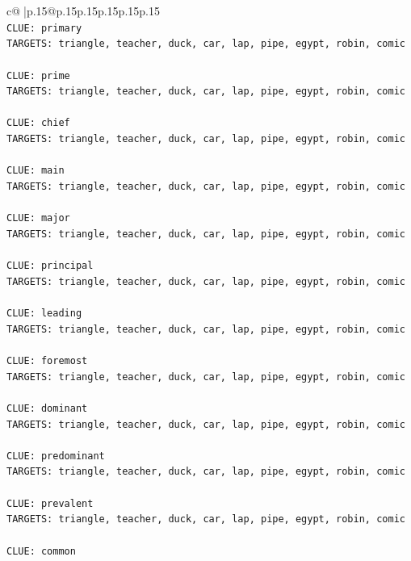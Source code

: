 \documentclass{article}
\begin{document}
{\begin{supertabular}{c@{$\;$}|p{.15\linewidth}@{}p{.15\linewidth}p{.15\linewidth}p{.15\linewidth}p{.15\linewidth}p{.15\linewidth}}
{{{\\ 
\texttt{CLUE: primary} \\
\texttt{TARGETS: triangle, teacher, duck, car, lap, pipe, egypt, robin, comic} \\
\\ 
\texttt{CLUE: prime} \\
\texttt{TARGETS: triangle, teacher, duck, car, lap, pipe, egypt, robin, comic} \\
\\ 
\texttt{CLUE: chief} \\
\texttt{TARGETS: triangle, teacher, duck, car, lap, pipe, egypt, robin, comic} \\
\\ 
\texttt{CLUE: main} \\
\texttt{TARGETS: triangle, teacher, duck, car, lap, pipe, egypt, robin, comic} \\
\\ 
\texttt{CLUE: major} \\
\texttt{TARGETS: triangle, teacher, duck, car, lap, pipe, egypt, robin, comic} \\
\\ 
\texttt{CLUE: principal} \\
\texttt{TARGETS: triangle, teacher, duck, car, lap, pipe, egypt, robin, comic} \\
\\ 
\texttt{CLUE: leading} \\
\texttt{TARGETS: triangle, teacher, duck, car, lap, pipe, egypt, robin, comic} \\
\\ 
\texttt{CLUE: foremost} \\
\texttt{TARGETS: triangle, teacher, duck, car, lap, pipe, egypt, robin, comic} \\
\\ 
\texttt{CLUE: dominant} \\
\texttt{TARGETS: triangle, teacher, duck, car, lap, pipe, egypt, robin, comic} \\
\\ 
\texttt{CLUE: predominant} \\
\texttt{TARGETS: triangle, teacher, duck, car, lap, pipe, egypt, robin, comic} \\
\\ 
\texttt{CLUE: prevalent} \\
\texttt{TARGETS: triangle, teacher, duck, car, lap, pipe, egypt, robin, comic} \\
\\ 
\texttt{CLUE: common} \\
}}}
\end{supertabular}}
\end{document}
